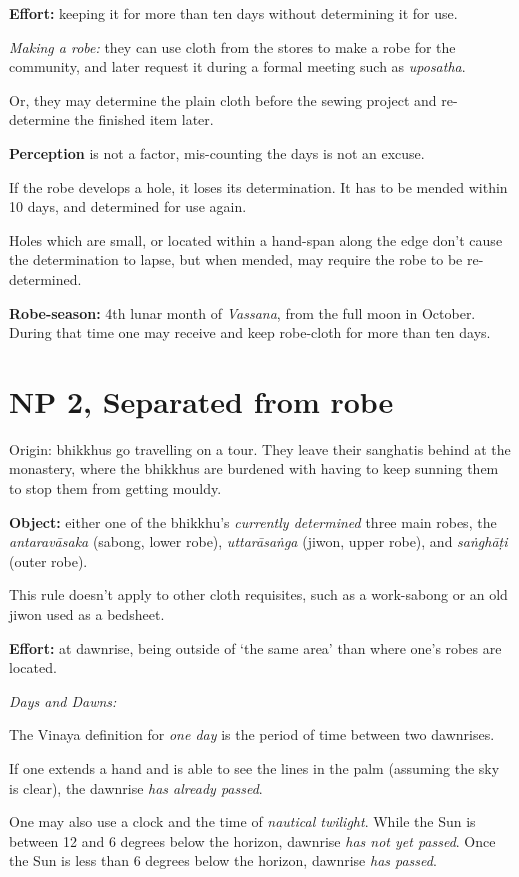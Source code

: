 \textbf{Effort:} keeping it for more than ten days without determining
it for use.

\emph{Making a robe:} they can use cloth from the stores to make a robe
for the community, and later request it during a formal meeting such as
\emph{uposatha}.

Or, they may determine the plain cloth before the sewing project and
re-determine the finished item later.

\textbf{Perception} is not a factor, mis-counting the days is not an
excuse.

If the robe develops a hole, it loses its determination. It has to be
mended within 10 days, and determined for use again.

Holes which are small, or located within a hand-span along the edge
don't cause the determination to lapse, but when mended, may require the
robe to be re-determined.

\textbf{Robe-season:} 4th lunar month of \emph{Vassana}, from the full
moon in October. During that time one may receive and keep robe-cloth
for more than ten days.

\section{NP 2, Separated from robe}

Origin: bhikkhus go travelling on a tour. They leave their sanghatis
behind at the monastery, where the bhikkhus are burdened with having to
keep sunning them to stop them from getting mouldy.

\textbf{Object:} either one of the bhikkhu's \emph{currently determined}
three main robes, the \emph{antaravāsaka} (sabong, lower robe),
\emph{uttarāsaṅga} (jiwon, upper robe), and \emph{saṅghāṭi} (outer
robe).

This rule doesn't apply to other cloth requisites, such as a work-sabong
or an old jiwon used as a bedsheet.

\textbf{Effort:} at dawnrise, being outside of `the same area' than
where one's robes are located.

\emph{Days and Dawns:}

The Vinaya definition for \emph{one day} is the period of time between
two dawnrises.

If one extends a hand and is able to see the lines in the palm (assuming
the sky is clear), the dawnrise \emph{has already passed}.

One may also use a clock and the time of \emph{nautical twilight}. While
the Sun is between 12 and 6 degrees below the horizon, dawnrise
\emph{has not yet passed}. Once the Sun is less than 6 degrees below the
horizon, dawnrise \emph{has passed}.

